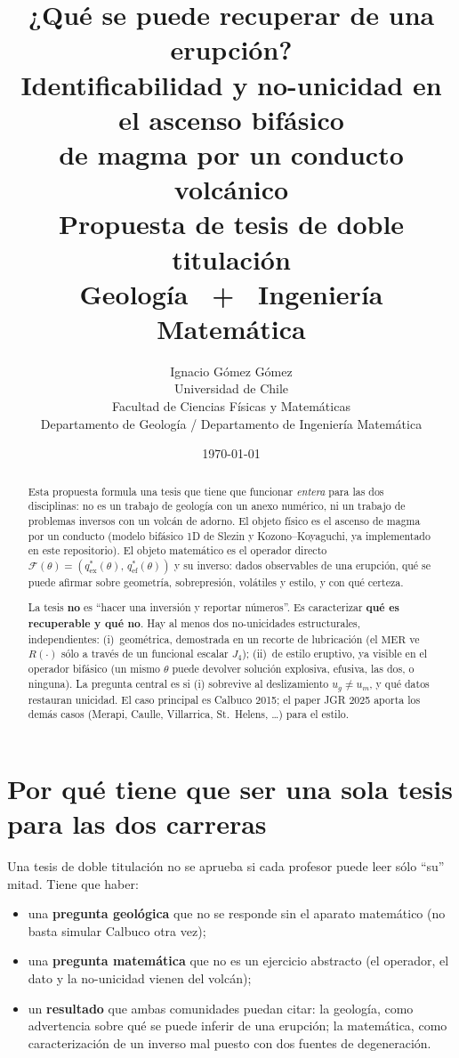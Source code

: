 \documentclass[11pt,a4paper]{article}
\title{\vspace{-1.3cm}
\textbf{¿Qué se puede recuperar de una erupción?}\\[0.35em]
\large Identificabilidad y no-unicidad en el ascenso bifásico\\
de magma por un conducto volcánico\\[0.7em]
\normalsize Propuesta de tesis de \textbf{doble titulación}\\
Geología \ + \ Ingeniería Matemática}
\author{Ignacio Gómez Gómez\\[0.3em]
{\small Universidad de Chile}\\
{\small Facultad de Ciencias Físicas y Matemáticas}\\
{\small Departamento de Geología \quad / \quad Departamento de Ingeniería Matemática}}
\date{\today}
\theoremstyle{plain}
\theoremstyle{definition}
\theoremstyle{remark}
\newcommand{\MER}{\mathrm{MER}}
\newcommand{\F}{\mathcal{F}}
\begin{document}
\maketitle
\vspace{-0.6cm}

\begin{abstract}\noindent
Esta propuesta formula una tesis que tiene que funcionar \emph{entera} para
las dos disciplinas: no es un trabajo de geología con un anexo numérico, ni
un trabajo de problemas inversos con un volcán de adorno. El objeto físico
es el ascenso de magma por un conducto (modelo bifásico 1D de Slezin y
Kozono--Koyaguchi, ya implementado en este repositorio). El objeto
matemático es el operador directo
$\F(\theta)=(q_{\mathrm{ex}}^\ast(\theta),\,q_{\mathrm{ef}}^\ast(\theta))$
y su inverso: dados observables de una erupción, qué se puede afirmar
sobre geometría, sobrepresión, volátiles y estilo, y con qué certeza.

La tesis \textbf{no} es ``hacer una inversión y reportar números''. Es
caracterizar \textbf{qué es recuperable y qué no}. Hay al menos dos
no-unicidades estructurales, independientes: (i)~geométrica, demostrada
en un recorte de lubricación (el $\MER$ ve $R(\cdot)$ sólo a través de
un funcional escalar $J_4$); (ii)~de estilo eruptivo, ya visible en el
operador bifásico (un mismo $\theta$ puede devolver solución explosiva,
efusiva, las dos, o ninguna). La pregunta central es si (i) sobrevive
al deslizamiento $u_g\neq u_m$, y qué datos restauran unicidad. El caso
principal es Calbuco 2015; el paper JGR 2025 aporta los demás casos
(Merapi, Caulle, Villarrica, St.\ Helens, \ldots) para el estilo.
\end{abstract}

\tableofcontents
\vspace{0.8em}

\section{Por qué tiene que ser una sola tesis para las dos carreras}
\label{sec:doble}

Una tesis de doble titulación no se aprueba si cada profesor puede leer
sólo ``su'' mitad. Tiene que haber:

\begin{itemize}
\item una \textbf{pregunta geológica} que no se responde sin el aparato
  matemático (no basta simular Calbuco otra vez);
\item una \textbf{pregunta matemática} que no es un ejercicio abstracto
  (el operador, el dato y la no-unicidad vienen del volcán);
\item un \textbf{resultado} que ambas comunidades puedan citar: la
  geología, como advertencia sobre qué se puede inferir de una erupción;
  la matemática, como caracterización de un inverso mal puesto con
  dos fuentes de degeneración.
\end{itemize}
\end{document}
